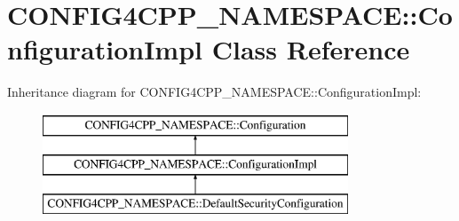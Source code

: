 \hypertarget{classCONFIG4CPP__NAMESPACE_1_1ConfigurationImpl}{\section{C\-O\-N\-F\-I\-G4\-C\-P\-P\-\_\-\-N\-A\-M\-E\-S\-P\-A\-C\-E\-:\-:Configuration\-Impl Class Reference}
\label{classCONFIG4CPP__NAMESPACE_1_1ConfigurationImpl}
}
Inheritance diagram for C\-O\-N\-F\-I\-G4\-C\-P\-P\-\_\-\-N\-A\-M\-E\-S\-P\-A\-C\-E\-:\-:Configuration\-Impl\-:\begin{figure}[H]
\begin{center}
\leavevmode
\includegraphics[height=3.000000cm]{classCONFIG4CPP__NAMESPACE_1_1ConfigurationImpl}
\end{center}
\end{figure}
